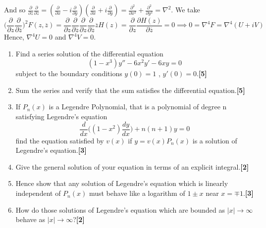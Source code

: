 \documentclass[a4paper]{article}
\begin{document}
\begin{ans}
\begin{enumerate}[label=(\roman*)]
And so $\frac{\partial}{\partial z}\frac{\partial}{\partial\overline{z}}=(\frac{\partial}{\partial x}-i\frac{\partial}{\partial y})(\frac{\partial}{\partial x}+i\frac{\partial}{\partial y})=\frac{\partial^2}{\partial x^2}+\frac{\partial^2}{\partial y^2}=\nabla^2$.  We take 
$$\bigg(\frac{\partial}{\partial z}\frac{\partial}{\partial\overline{z}}\bigg)^2F(z,\overline{z})=\frac{\partial}{\partial z}\frac{\partial}{\partial\overline{z}}\frac{\partial}{\partial z}\frac{\partial}{\partial\overline{z}}\overline{z}H(z)=\frac{\partial}{\partial z}\frac{\partial H(z)}{\partial\overline{z}}=0\implies0=\nabla^4F=\nabla^4(U+iV)$$
Hence, $\nabla^4U=0$ and $\nabla^4V=0$.
\end{enumerate}
\end{ans}
\newpage
\begin{qns}\leavevmode
\begin{enumerate}[label=(\roman*)]
\item Find a series solution of the differential equation
$$(1-x^3)y''-6x^2y'-6xy=0$$
subject to the boundary conditions $y(0) = 1$ , $y'(0)=0$.\hfill \textbf{[5]}
\item Sum the series and verify that the sum satisfies the differential equation.\hfill \textbf{[5]}
\item If $P_n(x)$ is a Legendre Polynomial, that is a polynomial of degree n satisfying Legendre’s equation
$$\frac{d}{dx}\bigg((1-x^2)\frac{dy}{dx}\bigg)+n(n+1)y=0$$
find the equation satisfied by $v(x)$ if $y = v(x)P_n(x)$ is a solution of Legendre’s equation.\hfill \textbf{[3]}
\item Give the general solution of your equation in terms of an explicit integral.\hfill \textbf{[2]}
\item Hence show that any solution of Legendre’s equation which is linearly independent of $P_n(x)$ must behave like a logarithm of $1\pm x$ near $x=\mp1$.\hfill \textbf{[3]}
\item How do those solutions of Legendre’s equation which are bounded as $|x|\rightarrow\infty$ behave
as $|x|\rightarrow\infty$?\hfill \textbf{[2]}
\end{enumerate}
\end{qns}
\end{document}
